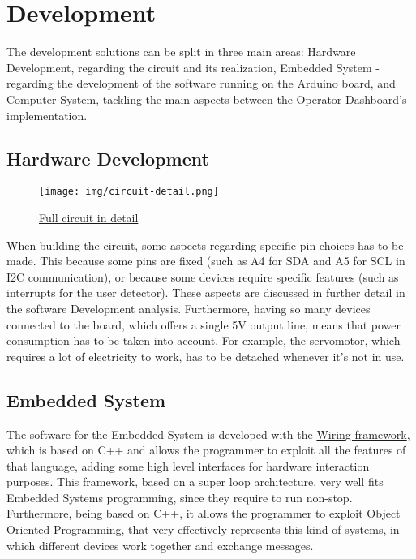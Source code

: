 \documentclass[a4paper,12pt]{report}
\begin{document}
	\chapter{Development}
	The development solutions can be split in three main areas: Hardware Development, regarding the circuit and its realization, Embedded System - regarding the development of the software running on the Arduino board, and Computer System, tackling the main aspects between the Operator Dashboard's implementation.
	
	\section{Hardware Development}
	\begin{figure}[H]
		\centering
		\texttt{[image: img/circuit-detail.png]}
		\caption{\href{https://www.tinkercad.com/things/1OaxE8QuWbw-esiot-assignment02?sharecode=9QQajaw8It3u4rzvy1XqA17RKAIlDJlUtWD6_dBJsmI}{Full circuit in detail}}
		\label{img:full-circuit}
	\end{figure}
	When building the circuit, some aspects regarding specific pin choices has to be made. This because some pins are fixed (such as A4 for SDA and A5 for SCL in I2C communication), or because some devices require specific features (such as interrupts for the user detector). These aspects are discussed in further detail in the software Development analysis.
	\newline Furthermore, having so many devices connected to the board, which offers a single 5V output line, means that power consumption has to be taken into account. For example, the servomotor, which requires a lot of electricity to work, has to be detached whenever it's not in use.
	
	\section{Embedded System}
	The software for the Embedded System is developed with the \href{https://wiring.org.co/}{Wiring framework}, which is based on C++ and allows the programmer to exploit all the features of that language, adding some high level interfaces for hardware interaction purposes. This framework, based on a super loop architecture, very well fits Embedded Systems programming, since they require to run non-stop. Furthermore, being based on C++, it allows the programmer to exploit Object Oriented Programming, that very effectively represents this kind of systems, in which different devices work together and exchange messages.
	
\end{document}
